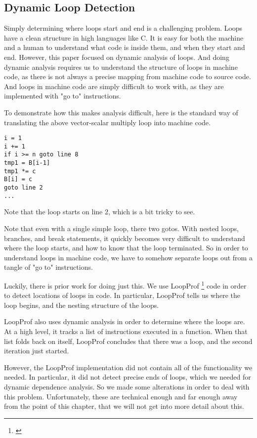 \documentclass[12pt,twoside]{reedthesis}
\begin{document}
		\subsection{Dynamic Loop Detection}
		
		Simply determining where loops start and end is a challenging problem. 
		Loops have a clean structure in high languages like C. It is easy for both the machine and a human to understand what code is inside them, and when they start and end. However, this paper focused on dynamic analysis of loops. And doing dynamic analysis requires us to understand the structure of loops in machine code, as there is not always a precise mapping from machine code to source code. And loops in machine code are simply difficult to work with, as they are implemented with "go to" instructions.
		
		To demonstrate how this makes analysis difficult, here is the standard way of translating the above vector-scalar multiply loop into machine code. 
		
		\begin{lstlisting}
i = 1
i += 1
if i >= n goto line 8
tmp1 = B[i-1]
tmp1 *= c
B[i] = c
goto line 2
...
		\end{lstlisting}
		
		Note that the loop starts on line 2, which is a bit tricky to see. 
		
		Note that even with a single simple loop, there two gotos. With nested loops, branches, and break statements, it quickly becomes very difficult to understand where the loop starts, and how to know that the loop terminated.
		So in order to understand loops in machine code, we have to somehow separate loops out from a tangle of "go to" instructions. 
		
		Luckily, there is prior work for doing just this. We use LoopProf \footnote{\cite{Chen:2004}} code in order to detect locations of loops in code. In particular, LoopProf tells us where the loop begins, and the nesting structure of the loops. 
		
		LoopProf also uses dynamic analysis in order to determine where the loops are. At a high level, it tracks a list of instructions executed in a function. When that list folds back on itself, LoopProf concludes that there was a loop, and the second iteration just started. 
		
		However, the LoopProf implementation did not contain all of the functionality we needed. In particular, it did not detect precise ends of loops, which we needed for dynamic dependence analysis. So we made some alterations in order to deal with this problem. Unfortunately, these are technical enough and far enough away from the point of this chapter, that we will not get into more detail about this. 
		
\end{document}
